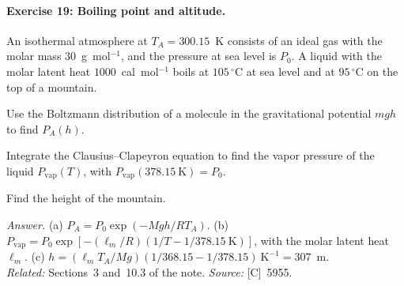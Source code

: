 \documentclass[11pt]{article}      %
\numberwithin{equation}{section}   %
\begin{document}
\paragraph{Exercise 19: Boiling point and altitude.}
An isothermal atmosphere at $T_A = 300.15$~K consists of an ideal gas with the molar mass $30$~g~mol$^{-1}$, and the pressure at sea level is $P_0$. A liquid with the molar latent heat $1000$~cal~mol$^{-1}$ boils at $105\,^\circ$C at sea level and at $95\,^\circ$C on the top of a mountain.
\begin{parts}
    \item Use the Boltzmann distribution of a molecule in the gravitational potential $mgh$ to find $P_A(h)$.
    \item Integrate the Clausius--Clapeyron equation to find the vapor pressure of the liquid $P_{\text{vap}}(T)$, with $P_{\text{vap}}(378.15~\text{K}) = P_0$.
    \item Find the height of the mountain.
\end{parts}
\textit{Answer.} (a) $P_A = P_0\exp(-Mgh/RT_A)$. (b) $P_{\text{vap}} = P_0\exp[-(\ell_m/R)(1/T - 1/378.15~\text{K})]$, with the molar latent heat $\ell_m$. (c) $h = (\ell_mT_A/Mg)(1/368.15 - 1/378.15)~\text{K}^{-1} = 307$~m.\\
\textit{Related:} Sections~3 and~10.3 of the note. \textit{Source:} [C]~5955.
\end{document}
